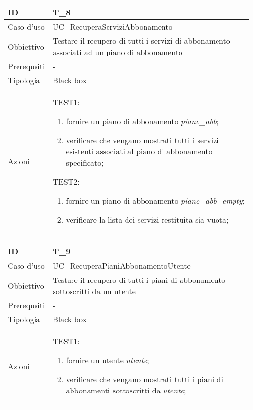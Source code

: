 \begin{table}[hb]
    \centering
    \begin{tabular}{ |p{2cm}|p{10cm}|  }
        \hline
        ID & T\_8 \\\hline
        Caso d'uso & UC\_RecuperaServiziAbbonamento \\\hline   
        Obbiettivo & Testare il recupero di tutti i servizi di abbonamento associati ad un piano di abbonamento \\\hline
        Prerequsiti & - \\\hline
        Tipologia & Black box \\\hline
        Azioni & 
        TEST1:
        \begin{enumerate}[topsep=0pt]
            \item fornire un piano di abbonamento \emph{piano\_abb};
            \item verificare che vengano mostrati tutti i servizi esistenti associati al piano di abbonamento specificato;
        \end{enumerate}
        \vspace{0.5cm} TEST2:
        \begin{enumerate}[topsep=0pt]
            \item fornire un piano di abbonamento \emph{piano\_abb\_empty};
            \item verificare la lista dei servizi restituita sia vuota;
        \end{enumerate}
        \\\hline
    \end{tabular}
\end{table}

\begin{table}[hb]
    \centering
    \begin{tabular}{ |p{2cm}|p{10cm}|  }
        \hline
        ID & T\_9 \\\hline
        Caso d'uso & UC\_RecuperaPianiAbbonamentoUtente \\\hline   
        Obbiettivo & Testare il recupero di tutti i piani di abbonamento sottoscritti da un utente \\\hline
        Prerequsiti & - \\\hline
        Tipologia & Black box \\\hline
        Azioni & 
        TEST1:
        \begin{enumerate}[topsep=0pt]
            \item fornire un utente \emph{utente};
            \item verificare che vengano mostrati tutti i piani di abbonamenti sottoscritti da \emph{utente};
        \end{enumerate}
        \\\hline
    \end{tabular}
\end{table}

